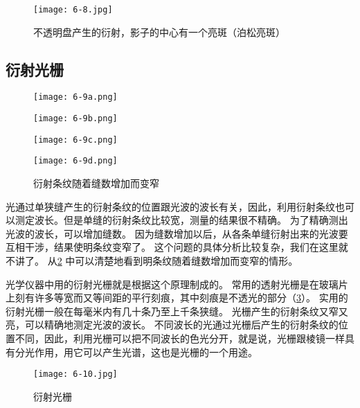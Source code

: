 \begin{figure}
\texttt{[image: 6-8.jpg]}
\caption{不透明盘产生的衍射，影子的中心有一个亮斑（泊松亮斑）}\label{fig:6-8}
\end{figure}

\subsection{衍射光栅}
\begin{figure}
  \begin{minipage}{0.24\linewidth}\centering
    \texttt{[image: 6-9a.png]}
    \label{fig:6-9a}
  \end{minipage} 
  \begin{minipage}{0.24\linewidth}\centering
    \texttt{[image: 6-9b.png]}
    \label{fig:6-9b}
  \end{minipage} 
  \begin{minipage}{0.24\linewidth}\centering
    \texttt{[image: 6-9c.png]}
    \label{fig:6-9c}
  \end{minipage} 
  \begin{minipage}{0.24\linewidth}\centering
    \texttt{[image: 6-9d.png]}
    \label{fig:6-9d}
  \end{minipage}
	\caption{衍射条纹随着缝数增加而变窄}\label{fig:6-9}
\end{figure}

光通过单狭缝产生的衍射条纹的位置跟光波的波长有关，因此，利用衍射条纹也可以测定波长。但是单缝的衍射条纹比较宽，测量的结果很不精确。
为了精确测出光波的波长，可以增加缝数。
因为缝数增加以后，从各条单缝衍射出来的光波要互相干涉，结果使明条纹变窄了。
这个问题的具体分析比较复杂，我们在这里就不讲了。
从\cref{fig:6-9} 中可以清楚地看到明条纹随着缝数增加而变窄的情形。

光学仪器中用的衍射光栅就是根据这个原理制成的。
常用的透射光栅是在玻璃片上刻有许多等宽而又等间距的平行刻痕，其中刻痕是不透光的部分（\cref{fig:6-10}）。
实用的衍射光栅一般在每毫米内有几十条乃至上千条狭缝。
光栅产生的衍射条纹又窄又亮，可以精确地测定光波的波长。
不同波长的光通过光栅后产生的衍射条纹的位置不同，因此，利用光栅可以把不同波长的色光分开，就是说，光栅跟棱镜一样具有分光作用，用它可以产生光谱，这也是光栅的一个用途。
\begin{figure}
  \texttt{[image: 6-10.jpg]}
  \caption{衍射光栅}\label{fig:6-10}
\end{figure}

